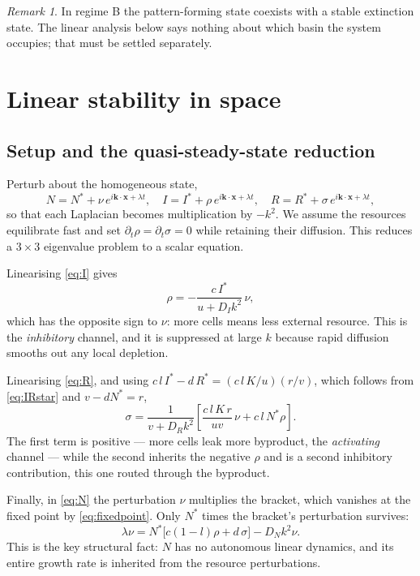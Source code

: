 \documentclass[11pt,a4paper]{article}
\newcommand{\Ns}{N^{*}}
\newcommand{\Is}{I^{*}}
\newcommand{\Rs}{R^{*}}
\theoremstyle{plain}
\theoremstyle{remark}
\newtheorem*{rem}{Remark}
\begin{document}
\begin{rem}
In regime B the pattern-forming state coexists with a stable extinction state.
The linear analysis below says nothing about which basin the system occupies;
that must be settled separately.
\end{rem}

\section{Linear stability in space}

\subsection{Setup and the quasi-steady-state reduction}

Perturb about the homogeneous state,
\begin{equation}
N = \Ns + \nu\,e^{i\mathbf{k}\cdot\mathbf{x}+\lambda t},\quad
I = \Is + \rho\,e^{i\mathbf{k}\cdot\mathbf{x}+\lambda t},\quad
R = \Rs + \sigma\,e^{i\mathbf{k}\cdot\mathbf{x}+\lambda t},
\end{equation}
so that each Laplacian becomes multiplication by $-k^2$. We assume the
resources equilibrate fast and set $\partial_t\rho=\partial_t\sigma=0$ while
retaining their diffusion. This reduces a $3\times3$ eigenvalue problem to a
scalar equation.

Linearising \eqref{eq:I} gives
\begin{equation}
\rho = -\frac{c\,\Is}{u + D_Ik^2}\,\nu ,
\label{eq:rho}
\end{equation}
which has the opposite sign to $\nu$: more cells means less external resource.
This is the \emph{inhibitory} channel, and it is suppressed at large $k$ because
rapid diffusion smooths out any local depletion.

Linearising \eqref{eq:R}, and using
$c\,l\,\Is - d\,\Rs = (c\,l\,K/u)(r/v)$, which follows from \eqref{eq:IRstar}
and $v-dN^*=r$,
\begin{equation}
\sigma = \frac{1}{v+D_Rk^2}\left[\frac{c\,l\,K\,r}{uv}\,\nu + c\,l\,\Ns\rho\right].
\label{eq:sigma}
\end{equation}
The first term is positive --- more cells leak more byproduct, the
\emph{activating} channel --- while the second inherits the negative $\rho$ and
is a second inhibitory contribution, this one routed through the byproduct.

Finally, in \eqref{eq:N} the perturbation $\nu$ multiplies the bracket, which
vanishes at the fixed point by \eqref{eq:fixedpoint}. Only $\Ns$ times the
bracket's perturbation survives:
\begin{equation}
\lambda\nu = \Ns\bigl[c(1-l)\rho + d\,\sigma\bigr] - D_Nk^2\nu .
\label{eq:Neq}
\end{equation}
This is the key structural fact: $N$ has no autonomous linear dynamics, and its
entire growth rate is inherited from the resource perturbations.
\end{document}
